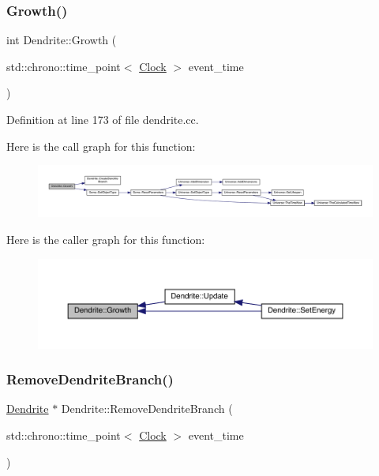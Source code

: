 \subsubsection{\texorpdfstring{Growth()}{Growth()}}
{\footnotesize\ttfamily int Dendrite\+::\+Growth (\begin{DoxyParamCaption}\item[{std\+::chrono\+::time\+\_\+point$<$ \hyperlink{universe_8h_a0ef8d951d1ca5ab3cfaf7ab4c7a6fd80}{Clock} $>$}]{event\+\_\+time }\end{DoxyParamCaption})}



Definition at line 173 of file dendrite.\+cc.

Here is the call graph for this function\+:
\nopagebreak
\begin{figure}[H]
\begin{center}
\leavevmode
\includegraphics[width=350pt]{class_dendrite_a6a0c08a642c92d8e189e1f7eff6f6b00_cgraph}
\end{center}
\end{figure}
Here is the caller graph for this function\+:
\nopagebreak
\begin{figure}[H]
\begin{center}
\leavevmode
\includegraphics[width=350pt]{class_dendrite_a6a0c08a642c92d8e189e1f7eff6f6b00_icgraph}
\end{center}
\end{figure}
\mbox{\label{class_dendrite_aa23bd0ce7c5a0a9011b28234cc2e90e1}} 
\subsubsection{\texorpdfstring{Remove\+Dendrite\+Branch()}{RemoveDendriteBranch()}}
{\footnotesize\ttfamily \hyperlink{class_dendrite}{Dendrite} $\ast$ Dendrite\+::\+Remove\+Dendrite\+Branch (\begin{DoxyParamCaption}\item[{std\+::chrono\+::time\+\_\+point$<$ \hyperlink{universe_8h_a0ef8d951d1ca5ab3cfaf7ab4c7a6fd80}{Clock} $>$}]{event\+\_\+time }\end{DoxyParamCaption})}




